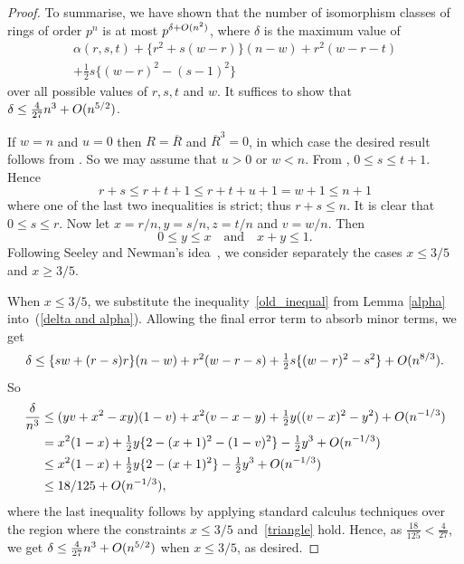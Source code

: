 \documentclass[12pt]{article}
\begin{document}
\begin{proof}
To summarise, we have shown that the number of isomorphism classes of rings of order $p^n$ is at most $p^{\delta+\mathnormal{O}(n^2)}$, where $\delta$ is the maximum value of
\begin{multline} \label{delta and alpha}
\alpha(r, s, t) +  \{r^{2} + s(w - r)\}(n - w) + r^{2}(w - r - t)  \\
 + \tfrac{1}{2}s\{(w - r)^{2} - (s - 1)^{2}\}
\end{multline}
over all possible values of $r,s,t$ and $w$. It suffices to show that $\delta\leq \frac{4}{27}n^{3} + \mathnormal{O}(n^{5/2})$. 

If $w=n$ and $u=0$ then $R = \overline{R}$ and $\overline{R}^{3} = 0$, in which case the desired result follows from \cite[Theorem~2.2]{K & P}. So we may assume that $u>0$ or $w<n$. From \cite[Corollary 5.3]{K & P},  $0\leq s\leq t+1$. Hence
\[
r + s \leq r + t + 1 \leq r+t+u+1 = w+1 \leq n+1
\]
where one of the last two inequalities is strict; thus $r + s \leq n$. It is clear that $0 \leq s \leq r$. Now let $x = r/n, y = s/n, z = t/n$ and $v = w/n$. Then 
\begin{equation} \label{triangle}
0 \leq y \leq x \quad \textrm{and} \quad x + y \leq 1.
\end{equation}
Following Seeley and Newman's idea~\cite{SeeleyNewman}, we consider separately the cases $x \leq 3/5$ and $x \geq 3/5$.
\par When $x \leq 3/5$, we substitute the inequality~\eqref{old_inequal} from Lemma \ref{alpha} into~(\ref{delta and alpha}). Allowing the final error term to absorb minor terms, we get
\begin{displaymath}
\delta \leq  \{sw + (r - s)r\}(n - w) + r^{2}(w - r - s) + \tfrac{1}{2}s\{(w - r)^{2} - s^{2}\} + \mathnormal{O}(n^{8/3}) .
\end{displaymath}
So
\begin{align*}
\frac{\delta}{n^{3}} & \leq  (yv + x^{2} - xy)(1 - v) + x^{2}(v - x - y) + \tfrac{1}{2}y((v - x)^{2} - y^{2}) + \mathnormal{O}(n^{-1/3}) \\
 & = x^{2}(1 - x) + \tfrac{1}{2}y\{2 - (x + 1)^{2} - (1 - v)^{2}\} - \tfrac{1}{2}y^{3} + \mathnormal{O}(n^{-1/3}) \\
& \leq   x^{2}(1 - x) + \tfrac{1}{2}y\{2 - (x + 1)^{2}\} - \tfrac{1}{2}y^{3} + \mathnormal{O}(n^{-1/3})\\
&\leq 18/125+\mathnormal{O}(n^{-1/3}),
\end{align*}
where the last inequality follows by applying standard calculus techniques over the region where the constraints $x\leq 3/5$ and~\eqref{triangle} hold. Hence, as $\frac{18}{125} < \frac{4}{27}$, we get $\delta \leq\frac{4}{27}n^{3} + \mathnormal{O}(n^{5/2})$ when $x \leq 3/5$, as desired.



\end{proof}
\end{document}
